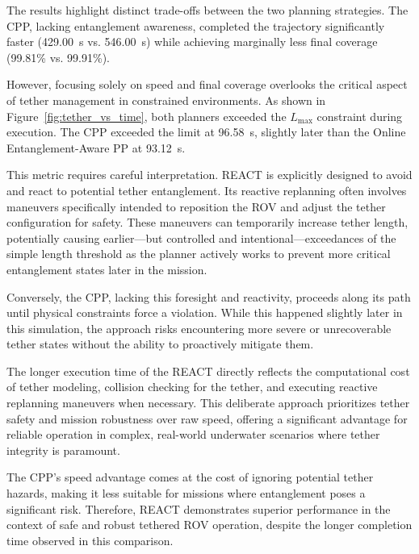 The results highlight distinct trade-offs between the two planning strategies. The \ac{CPP}, lacking entanglement awareness, completed the trajectory significantly faster (429.00~s vs. 546.00~s) while achieving marginally less final coverage (99.81\% vs. 99.91\%).

However, focusing solely on speed and final coverage overlooks the critical aspect of tether management in constrained environments. As shown in Figure~\ref{fig:tether_vs_time}, both planners exceeded the $L_{\text{max}}$ constraint during execution. The \ac{CPP} exceeded the limit at 96.58~s, slightly later than the Online Entanglement-Aware PP at 93.12~s. 

This metric requires careful interpretation. \ac{REACT} is explicitly designed to avoid and react to potential tether entanglement. Its reactive replanning often involves maneuvers specifically intended to reposition the \ac{ROV} and adjust the tether configuration for safety. These maneuvers can temporarily increase tether length, potentially causing earlier—but controlled and intentional—exceedances of the simple length threshold as the planner actively works to prevent more critical entanglement states later in the mission.

Conversely, the \ac{CPP}, lacking this foresight and reactivity, proceeds along its path until physical constraints force a violation. While this happened slightly later in this simulation, the approach risks encountering more severe or unrecoverable tether states without the ability to proactively mitigate them.

The longer execution time of the \ac{REACT} directly reflects the computational cost of tether modeling, collision checking for the tether, and executing reactive replanning maneuvers when necessary. This deliberate approach prioritizes tether safety and mission robustness over raw speed, offering a significant advantage for reliable operation in complex, real-world underwater scenarios where tether integrity is paramount. 

The \ac{CPP}'s speed advantage comes at the cost of ignoring potential tether hazards, making it less suitable for missions where entanglement poses a significant risk. Therefore, \ac{REACT} demonstrates superior performance in the context of safe and robust tethered \ac{ROV} operation, despite the longer completion time observed in this comparison.












